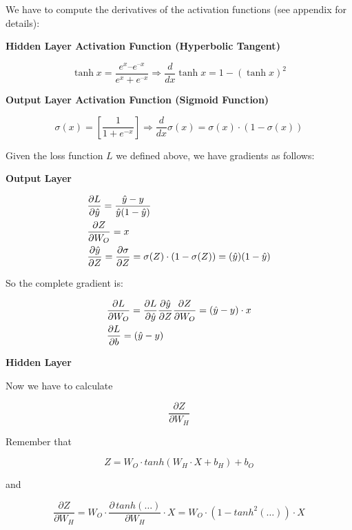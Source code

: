 \documentclass[11pt]{article}
\begin{document}
We have to compute the derivatives of the activation functions (see
appendix for details):

\textbf{Hidden Layer Activation Function (Hyperbolic Tangent)}

\begin{equation}
\tanh x = \frac{{{e^x} – {e^{ – x}}}}{{{e^x} + {e^{ – x}}}} 
\Rightarrow 
\frac{d}{{dx}}\tanh x =  1 - {\left(\tanh x \right)}^2 
\end{equation}

\textbf{Output Layer Activation Function (Sigmoid Function)}

\begin{equation}
\sigma(x) =  \left[ \dfrac{1}{1 + e^{-x}} \right]  \Rightarrow
\dfrac{d}{dx} \sigma(x) =  \sigma(x) \cdot (1 - \sigma(x))
\end{equation}

Given the loss function \(L\) we defined above, we have gradients as
follows:

\textbf{Output Layer}

\begin{align}
& \frac{\partial L}{\partial \hat y} = \frac{\hat y - y}{\hat y(1 - \hat y)} \notag\\
& \frac{\partial Z}{\partial W_O} = x \notag\\
& \frac{\partial \hat y}{\partial Z} = \frac{\partial \sigma}{\partial Z} = \sigma(Z) \cdot (1 - \sigma(Z)) = (\hat y) (1 - \hat y)
\end{align}

So the complete gradient is:

\begin{align}
& \frac{\partial L}{\partial W_O} =  \frac{\partial L}{\partial \hat y} \frac{\partial \hat y}{\partial Z} \frac{\partial Z}{\partial W_O} = (\hat y - y) \cdot x \notag\\
& \frac{\partial L}{\partial b} =  (\hat y - y)
\end{align}

\textbf{Hidden Layer}

Now we have to calculate

\[\frac{\partial Z}{\partial W_H}\]

Remember that

\[Z = W_O \cdot tanh\left( W_H \cdot X + b_H \right) + b_O\]

and

\[\frac{\partial Z}{\partial W_H} = W_O \cdot \frac{\partial \, tanh(\dots)}{\partial W_H} \cdot X = W_O \cdot \left( 1 - tanh^2(\dots) \right) \cdot X\]
\end{document}
